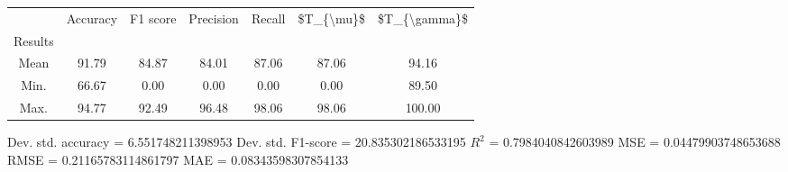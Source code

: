 \begin{tabular}{|c|c|c|c|c|c|c|}
\toprule
{} &  Accuracy &  F1 score &  Precision &  Recall &  \$T\_\{\textbackslash mu\}\$ &  \$T\_\{\textbackslash gamma\}\$ \\
Results &           &           &            &         &            &               \\
\hline
Mean    &     91.79 &     84.87 &      84.01 &   87.06 &      87.06 &         94.16 \\
Min.    &     66.67 &      0.00 &       0.00 &    0.00 &       0.00 &         89.50 \\
Max.    &     94.77 &     92.49 &      96.48 &   98.06 &      98.06 &        100.00 \\
\bottomrule
\end{tabular}

 Dev. std. accuracy = 6.551748211398953
 Dev. std. F1-score = 20.835302186533195
 $R^2$ = 0.7984040842603989
 MSE = 0.04479903748653688
 RMSE = 0.21165783114861797
 MAE = 0.08343598307854133